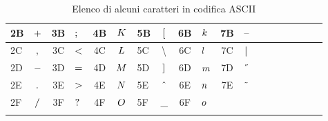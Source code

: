 \documentclass[../main.tex]{subfiles}
\begin{document}
\begin{table}[h!]
\begin{tabular}{ V{4} c | c V{4} c | c V{4} c | c V{4} c | c V{4} c | c V{4} c | c V{4} }
        \hline
        2B & $\char"2B$ & 3B & $\char"3B$ & 4B & $\char"4B$ & 5B & $\char"5B$ & 6B & $\char"6B$ & 7B & $\char"7B$ \\
        \hline
        2C & $\char"2C$ & 3C & $\char"3C$ & 4C & $\char"4C$ & 5C & $\char"5C$ & 6C & $\char"6C$ & 7C & $\char"7C$ \\
        \hline
        2D & $\char"2D$ & 3D & $\char"3D$ & 4D & $\char"4D$ & 5D & $\char"5D$ & 6D & $\char"6D$ & 7D & $\char"7D$ \\
        \hline
        2E & $\char"2E$ & 3E & $\char"3E$ & 4E & $\char"4E$ & 5E & $\char"5E$ & 6E & $\char"6E$ & 7E & $\char"7E$ \\
        \hline
        2F & $\char"2F$ & 3F & $\char"3F$ & 4F & $\char"4F$ & 5F & $\char"5F$ & 6F & $\char"6F$ & & \\
    \end{tabular}
    \caption{Elenco di alcuni caratteri in codifica ASCII}
\end{table}

\vspace*{-6mm}
\end{document}

